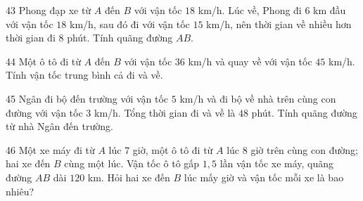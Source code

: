 \gap
\begin{probbox}{43}{}
Phong đạp xe từ $A$ đến $B$ với vận tốc $18$ km/h. Lúc về, Phong đi $6$ km đầu với vận tốc $18$ km/h, sau đó đi với vận tốc $15$ km/h, nên thời gian về nhiều hơn thời gian đi $8$ phút. Tính quãng đường $AB$.
\end{probbox}
\gap
\begin{probbox}{44}{}
Một ô tô đi từ $A$ đến $B$ với vận tốc $36$ km/h và quay về với vận tốc $45$ km/h. Tính vận tốc trung bình cả đi và về.
\end{probbox}
\gap
\begin{probbox}{45}{}
Ngân đi bộ đến trường với vận tốc $5$ km/h và đi bộ về nhà trên cùng con đường với vận tốc $3$ km/h. Tổng thời gian đi và về là $48$ phút. Tính quãng đường từ nhà Ngân đến trường.
\end{probbox}
\gap
\begin{probbox}{46}{}
Một xe máy đi từ $A$ lúc 7 giờ, một ô tô đi từ $A$ lúc 8 giờ trên cùng con đường; hai xe đến $B$ cùng một lúc. Vận tốc ô tô gấp $1{,}5$ lần vận tốc xe máy, quãng đường $AB$ dài $120$ km. Hỏi hai xe đến $B$ lúc mấy giờ và vận tốc mỗi xe là bao nhiêu?
\end{probbox}
